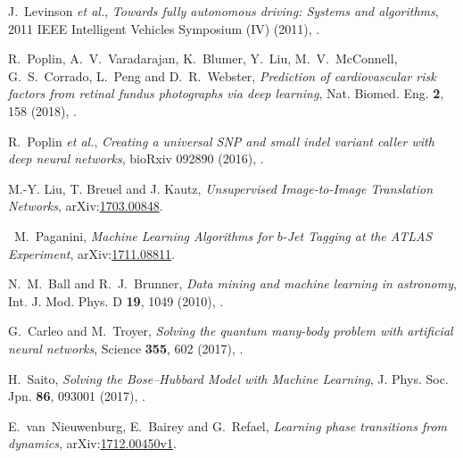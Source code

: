 \documentclass[11pt, a4paper]{report} %
\begin{document}
\begin{thebibliography}{99}
J.~Levinson \textit{et al.}, \textit{Towards fully autonomous driving: Systems and algorithms}, 2011 IEEE Intelligent Vehicles Symposium (IV) (2011), .




R.~Poplin, A.~V.~Varadarajan, K.~Blumer, Y.~Liu, M.~V.~McConnell, G.~S.~Corrado, L.~Peng and D.~R.~Webster, \textit{Prediction of cardiovascular risk factors from retinal fundus photographs via deep learning}, Nat. Biomed. Eng. \textbf{2}, 158 (2018), .




R.~Poplin \textit{et al.}, \textit{Creating a universal SNP and small indel variant caller with deep neural networks}, bioRxiv 092890 (2016), .




M.-Y. Liu, T. Breuel and J. Kautz, \textit{Unsupervised Image-to-Image Translation Networks}, arXiv:\href{https://arxiv.org/abs/1703.00848}{1703.00848}.



 \
M.~Paganini, \textit{Machine Learning Algorithms for $b$-Jet Tagging at the ATLAS Experiment}, arXiv:\href{https://arxiv.org/abs/1711.08811}{1711.08811}. 



N.~M.~Ball and R.~J.~Brunner, \textit{Data mining and machine learning in astronomy}, Int. J. Mod. Phys. D \textbf{19}, 1049 (2010), .




G.~Carleo and M.~Troyer, \textit{Solving the quantum many-body problem with artificial neural networks}, Science \textbf{355}, 602 (2017), .




H.~Saito, \textit{Solving the Bose–Hubbard Model with Machine Learning}, J. Phys. Soc. Jpn. \textbf{86}, 093001 (2017), .




E.~van~Nieuwenburg, E.~Bairey and G.~Refael, \textit{Learning phase transitions from dynamics}, arXiv:\href{https://arxiv.org/abs/1712.00450v1}{1712.00450v1}.





\end{thebibliography}
\end{document}
